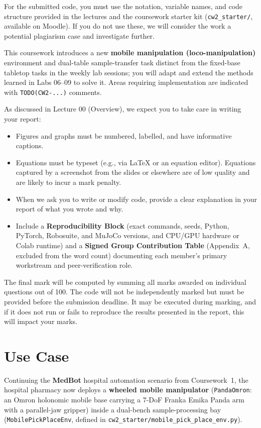 \documentclass[11pt,a4paper]{article}
\begin{document}
For the submitted code, you must use the notation, variable names, and code structure provided in the lectures and the coursework starter kit (\texttt{cw2\_starter/}, available on Moodle). If you do not use these, we will consider the work a potential plagiarism case and investigate further.

This coursework introduces a new \textbf{mobile manipulation (loco-manipulation)} environment and dual-table sample-transfer task distinct from the fixed-base tabletop tasks in the weekly lab sessions; you will adapt and extend the methods learned in Labs 06--09 to solve it. Areas requiring implementation are indicated with \texttt{TODO(CW2-...)} comments.

As discussed in Lecture 00 (Overview), we expect you to take care in writing your report:
\begin{itemize}[leftmargin=1.5em, itemsep=0.2em]
    \item Figures and graphs must be numbered, labelled, and have informative captions.
    \item Equations must be typeset (e.g., via \LaTeX{} or an equation editor). Equations captured by a screenshot from the slides or elsewhere are of low quality and are likely to incur a mark penalty.
    \item When we ask you to write or modify code, provide a clear explanation in your report of what you wrote and why.
    \item Include a \textbf{Reproducibility Block} (exact commands, seeds, Python, PyTorch, Robosuite, and MuJoCo versions, and CPU/GPU hardware or Colab runtime) and a \textbf{Signed Group Contribution Table} (Appendix~A, excluded from the word count) documenting each member's primary workstream and peer-verification role.
\end{itemize}

The final mark will be computed by summing all marks awarded on individual questions out of 100. The code will not be independently marked but must be provided before the submission deadline. It may be executed during marking, and if it does not run or fails to reproduce the results presented in the report, this will impact your marks.

\newpage

\section*{Use Case}
Continuing the \textbf{MedBot} hospital automation scenario from Coursework~1, the hospital pharmacy now deploys a \textbf{wheeled mobile manipulator} (\texttt{PandaOmron}: an Omron holonomic mobile base carrying a 7-DoF Franka Emika Panda arm with a parallel-jaw gripper) inside a dual-bench sample-processing bay (\texttt{MobilePickPlaceEnv}, defined in \texttt{cw2\_starter/mobile\_pick\_place\_env.py}).
\end{document}
